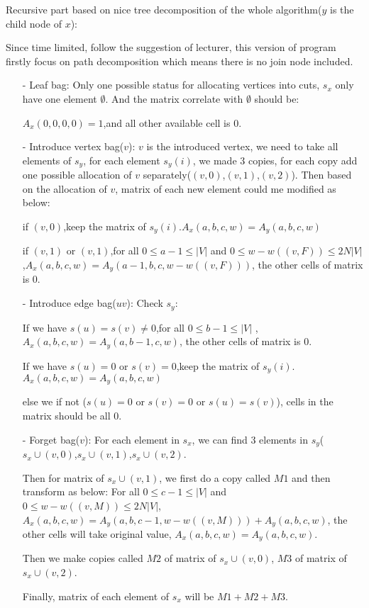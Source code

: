 \documentclass{article}
\begin{document}
\noindent Recursive part based on nice tree decomposition of the whole algorithm($y$ is the child node of $x$):

\noindent Since time limited, follow the suggestion of lecturer, this version of program firstly focus on path decomposition which means there is no join node included.
\begin{itemize}
\item[-] Leaf bag:
Only one possible status for allocating vertices into cuts, $s_x$ only have one element $\emptyset$. And the matrix correlate with $\emptyset$ should be: 

\noindent $A_x(0,0,0,0)=1$,and all other available cell is 0. 
\item[-] Introduce vertex bag($v$):
$v$ is the introduced vertex, we need to take all elements of $s_y$, for each element $s_y(i)$, we made 3 copies, for each copy add one possible allocation of $v$ separately($(v,0)$,$(v,1)$,$(v,2)$). Then based on the allocation of $v$, matrix of each new element could me modified as below:

\noindent if $(v,0)$,keep the matrix of $s_y(i)$.$A_x(a,b,c,w)=A_y(a,b,c,w)$

\noindent if $(v,1)$ or $(v,1)$,for all $0\leq a-1 \leq |V|$ and $0\leq w-w((v,F)) \leq  2N|V|$,$A_x(a,b,c,w)=A_y(a-1,b,c,w-w((v,F)))$, the other cells of matrix is 0.

\item[-] Introduce edge bag($uv$):
Check $s_y$:

\noindent If we have $s(u)=s(v)\neq 0$,for all $0\leq b-1 \leq |V|$ ,$A_x(a,b,c,w)=A_y(a,b-1,c,w)$, the other cells of matrix is 0.

\noindent If we have $s(u)=0$ or $s(v)=0$,keep the matrix of $s_y(i)$.$A_x(a,b,c,w)=A_y(a,b,c,w)$

\noindent else we if not ($s(u)=0$ or $s(v)=0$ or $s(u)=s(v)$), cells in the matrix should be all 0.

\item[-] Forget bag($v$):
For each element in $s_x$, we can find 3 elements in $s_y$($s_x\cup (v,0)$,$s_x\cup (v,1)$,$s_x\cup (v,2)$.

\noindent Then for matrix of $s_x\cup (v,1)$, we first do a copy called $M1$ and then transform as below:
For all $0\leq c-1 \leq |V|$ and $0\leq w-w((v,M)) \leq  2N|V|$,$A_x(a,b,c,w)=A_y(a,b,c-1,w-w((v,M)))+A_y(a,b,c,w)$, the other cells will take original value, $A_x(a,b,c,w)=A_y(a,b,c,w)$.

\noindent Then we make copies called $M2$ of matrix of $s_x\cup (v,0)$, $M3$ of matrix of $s_x\cup (v,2)$.

\noindent Finally, matrix of each element of $s_x$ will be $M1+M2+M3$.

\end{itemize}
\end{document}

